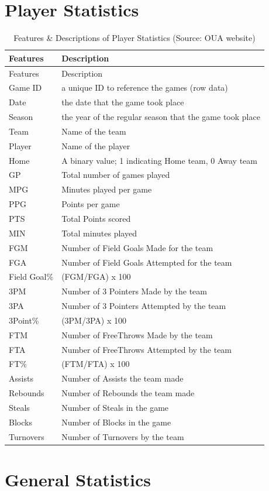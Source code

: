 \documentclass[]{book}
\begin{document}
\hypertarget{player-statistics}{%
\section{Player Statistics}\label{player-statistics}}

\begin{longtable}[]{@{}ll@{}}
\caption{\label{tab:player-stats} Features \& Descriptions of Player Statistics (Source: OUA website)}\tabularnewline
\toprule
Features & Description\tabularnewline
\midrule
\endfirsthead
\toprule
Features & Description\tabularnewline
\midrule
\endhead
Game ID & a unique ID to reference the games (row data)\tabularnewline
Date & the date that the game took place\tabularnewline
Season & the year of the regular season that the game took place\tabularnewline
Team & Name of the team\tabularnewline
Player & Name of the player\tabularnewline
Home & A binary value; 1 indicating Home team, 0 Away team\tabularnewline
GP & Total number of games played\tabularnewline
MPG & Minutes played per game\tabularnewline
PPG & Points per game\tabularnewline
PTS & Total Points scored\tabularnewline
MIN & Total minutes played\tabularnewline
FGM & Number of Field Goals Made for the team\tabularnewline
FGA & Number of Field Goals Attempted for the team\tabularnewline
Field Goal\% & (FGM/FGA) x 100\tabularnewline
3PM & Number of 3 Pointers Made by the team\tabularnewline
3PA & Number of 3 Pointers Attempted by the team\tabularnewline
3Point\% & (3PM/3PA) x 100\tabularnewline
FTM & Number of FreeThrows Made by the team\tabularnewline
FTA & Number of FreeThrows Attempted by the team\tabularnewline
FT\% & (FTM/FTA) x 100\tabularnewline
Assists & Number of Assists the team made\tabularnewline
Rebounds & Number of Rebounds the team made\tabularnewline
Steals & Number of Steals in the game\tabularnewline
Blocks & Number of Blocks in the game\tabularnewline
Turnovers & Number of Turnovers by the team\tabularnewline
\bottomrule
\end{longtable}

\hypertarget{general-statistics}{%
\section{General Statistics}\label{general-statistics}}
\end{document}
